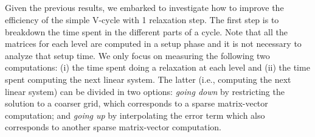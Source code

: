 \subsection{}

Given the previous results, we embarked to investigate how to improve the
efficiency of the simple V-cycle with 1 relaxation step. The first step is to
breakdown the time spent in the different parts of a cycle. Note that all the
matrices for each level are computed in a setup phase and it is not necessary
to analyze that setup time. We only focus on measuring the following two
computations: (i) the time spent doing a relaxation at each level and (ii) the
time spent computing the next linear system. The latter (i.e., computing the
next linear system) can be divided in two options: \emph{going down} by
restricting the solution to a coarser grid, which corresponds to a sparse
matrix-vector computation; and \emph{going up} by interpolating the error term
which also corresponds to another sparse matrix-vector computation.

\begin{table}[htb]
 \caption{Time breakdown of a V-cycle with $\alpha=1$.}
 \label{table.measures}
\end{table}

